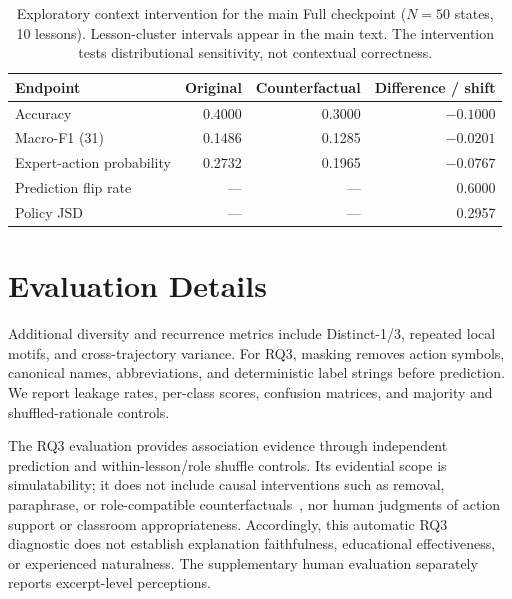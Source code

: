 \documentclass[manuscript,review,anonymous]{acmart}
\begin{document}
\begin{table}[t]
\centering
\small
\begin{tabular}{lrrr}
\toprule
Endpoint & Original & Counterfactual & Difference / shift \\
\midrule
Accuracy & 0.4000 & 0.3000 & $-0.1000$ \\
Macro-F1 (31) & 0.1486 & 0.1285 & $-0.0201$ \\
Expert-action probability & 0.2732 & 0.1965 & $-0.0767$ \\
Prediction flip rate & --- & --- & 0.6000 \\
Policy JSD & --- & --- & 0.2957 \\
\bottomrule
\end{tabular}
\caption{Exploratory context intervention for the main Full checkpoint
($N=50$ states, 10 lessons). Lesson-cluster intervals appear in the main text.
The intervention tests distributional sensitivity, not contextual correctness.}
\label{tab:context-intervention}
\end{table}
 
\section{Evaluation Details}
\label{sec:evaluation-details}

Additional diversity and recurrence metrics include Distinct-1/3, repeated local
motifs, and cross-trajectory variance. For RQ3, masking removes action symbols,
canonical names, abbreviations, and deterministic label strings before
prediction. We report leakage rates, per-class scores, confusion matrices, and
majority and shuffled-rationale controls.

The RQ3 evaluation provides association evidence through independent prediction
and within-lesson/role shuffle controls. Its evidential scope is simulatability;
it does not include causal interventions such as removal, paraphrase, or
role-compatible counterfactuals~\citep{deyoung2020eraser}, nor human judgments
of action support or classroom appropriateness. Accordingly, this automatic RQ3 diagnostic does not establish explanation
faithfulness, educational effectiveness, or experienced naturalness. The
supplementary human evaluation separately reports excerpt-level perceptions.
\end{document}
